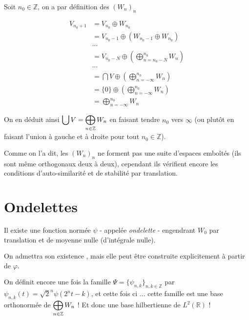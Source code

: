 	\begin{myproof}
		\label{sum_Wn_covers_Vn}
		Soit $n_0 \in \mathbb{Z}$, on a par définition des $(W_{n})_n$
		
		\begin{align*}
			V_{n_0+1} &= V_{n_0} \oplus W_{n_0} \\
			&= V_{n_0 - 1} \oplus \left(W_{n_0 - 1} \oplus W_{n_0} \right) \\
			& \cdots \\
			&= V_{n_0 - N} \oplus \left(\bigoplus_{n = n_0 - N}^{n_0} W_n \right) \\
			& \cdots \\
			&= \bigcap V \oplus \left(\bigoplus_{n = - \infty}^{n_0} W_n \right) \\
			&= \{0\} \oplus \left(\bigoplus_{n = - \infty}^{n_0} W_n \right) \\
			&= \bigoplus_{n = - \infty}^{n_0} W_n
		\end{align*}
		
		On en déduit ainsi $\displaystyle \bigcup V = \bigoplus_{n \in \mathbb{Z}} W_n$ en faisant tendre $n_0$ vers $\infty$ (ou plutôt en faisant l'union à gauche et à droite pour tout $n_0 \in \mathbb{Z}$).
		
		\cqfd
	\end{myproof}
	
	Comme on l'a dit, les $(W_n)_n$ ne forment pas une suite d'espaces emboîtés (ils sont même orthogonaux deux à deux), cependant ils vérifient encore les conditions d'auto-similarité et de stabilité par translation.

	\section{Ondelettes}

	\begin{mydef}
		Il existe une fonction normée $\psi$ - appelée \textit{ondelette} - engendrant $W_0$ par translation et de moyenne nulle (d'intégrale nulle).
		
		On admettra son existence \cite{wamsp}, mais elle peut être construite explicitement à partir de $\varphi$.
	\end{mydef}
		
	On définit encore une fois la famille $\Psi = \{\psi_{n, k}\}_{n, k \in \mathbb{Z}}$ par $\psi_{n, k}(t) = \sqrt{2}^n \psi(2^{n} t - k)$, et cette fois ci ... cette famille est une base orthonormée de $\displaystyle \bigoplus_{n \in \mathbb{Z}} W_n$ ! Et donc une base hilbertienne de $L^2(\mathbb{R})$ !
	
